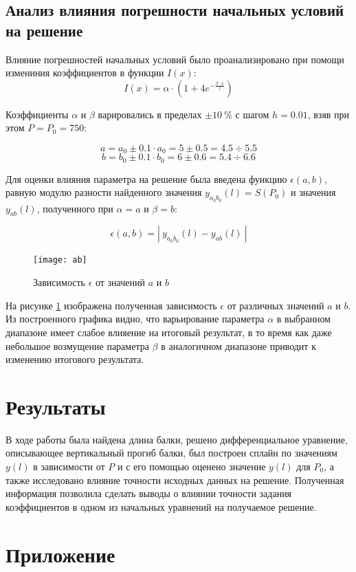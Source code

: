 \subsection{Анализ влияния погрешности начальных условий на решение}

Влияние погрешностей начальных условий было проанализировано при помощи измениния коэффициентов в функции $I(x)$:
\begin{equation}
I(x) = \alpha \cdot(1 + 4e^{-\frac{\beta\cdot x}{l}})
\end{equation}

Коэффициенты $\alpha$ и $\beta$ варировались в пределах $\pm 10\ \%$ с шагом $h = 0.01$, взяв при этом $P = P_0 = 750$:
\begin{multicols}{2}
\noindent
\[
	a = a_0 \pm 0.1\cdot a_0 = 5 \pm 0.5 = 4.5 \div 5.5
\]
\[
	b = b_0 \pm 0.1\cdot b_0 = 6 \pm 0.6 = 5.4 \div 6.6
\]
\end{multicols}

Для оценки влияния параметра на решение была введена функцию $\epsilon(a, b)$, равную модулю разности найденного значения $y_{a_0b_0}(l) = S(P_0)$ и значения $y_{ab}(l)$, полученного при $\alpha = a$ и $\beta = b$:

\begin{equation}
	\epsilon(a, b) = |\ y_{a_0b_0}(l) - y_{ab}(l)\ |
\end{equation}

\begin{figure}[H]
\begin{center}
	\vspace{-0.5cm}
	\texttt{[image: ab]}
	\caption{Зависимость $\epsilon$ от значений $a$ и $b$}
	\label{plt:ab}
	\vspace{-0.5cm}
\end{center}
\end{figure}

На рисунке \ref{plt:ab} изображена полученная зависимость $\epsilon$ от различных значений $a$ и $b$. Из построенного графика видно, что варьирование параметра  $\alpha$  в выбранном диапазоне имеет слабое влияение на итоговый результат, в то время как даже небольшое возмущение параметра  $\beta$  в аналогичном диапазоне приводит к изменению итогового результата.

\section{Результаты}

В ходе работы была найдена длина балки, решено дифференциальное уравнение, описывающее вертикальный прогиб балки, был построен сплайн по значениям $y(l)$ в зависимости от $P$ и с его помощью оценено значение $y(l)$ для $P_0$, а также исследовано влияние точности исходных данных на решение. Полученная информация позволила сделать выводы о влиянии точности задания коэффициентов в одном из начальных уравнений на получаемое решение.

\section*{Приложение}

